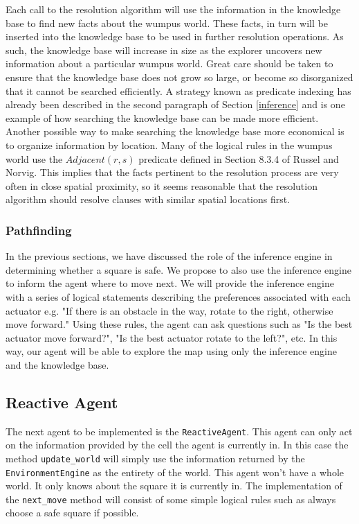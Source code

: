 \documentclass{article}
\begin{document}
				Each call to the resolution algorithm will use the information in the knowledge base to find new facts about the wumpus world.
				These facts, in turn will be inserted into the knowledge base to be used in further resolution operations.
				As such, the knowledge base will increase in size as the explorer uncovers new information about a particular wumpus world.
				Great care should be taken to ensure that the knowledge base does not grow so large, or become so disorganized that it cannot be searched efficiently.
				A strategy known as predicate indexing has already been described in the second paragraph of Section \ref{inference} and is one example of how searching the knowledge base can be made more efficient.
				Another possible way to make searching the knowledge base more economical is to organize information by location.
				Many of the logical rules in the wumpus world use the $Adjacent(r,s)$ predicate defined in Section 8.3.4 of Russel and Norvig.
				This implies that the facts pertinent to the resolution process are very often in close spatial proximity, so it seems reasonable that the resolution algorithm should resolve clauses with similar spatial locations first.
			
			
			\subsubsection{Pathfinding}
			
				In the previous sections, we have discussed the role of the inference engine in determining whether a square is safe. We propose to also use the inference engine to inform the agent where to move next.
				We will provide the inference engine with a series of logical statements describing the preferences associated with each actuator e.g. "If there is an obstacle in the way, rotate to the right, otherwise move forward." Using these rules, the agent can ask questions such as "Is the best actuator move forward?", "Is the best actuator rotate to the left?", etc. In this way, our agent will be able to explore the map using only the inference engine and the knowledge base.
			
		\subsection{Reactive Agent}
			The next agent to be implemented is the \texttt{ReactiveAgent}. This agent can only act on the information provided by the cell the agent is currently in. In this case the method \texttt{update\_world} will simply use  the information returned by the \texttt{EnvironmentEngine} as the entirety of the world. This agent won't have a whole world. It only knows about the square it is currently in. The implementation of the \texttt{next\_move} method will consist of some simple logical rules such as always choose a safe square if possible.
		
\end{document}
